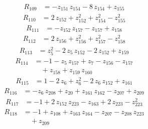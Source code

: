 \begin{equation*}\begin{aligned}
R_{109}&=-z_{151}\,z_{154} -8\,z_{154} +z_{155}
\end{aligned}\end{equation*}
\begin{equation*}\begin{aligned}
R_{110}&=2\,z_{152} +z_{152}^{2} +z_{154}^{2} -z_{155}^{2}
\end{aligned}\end{equation*}
\begin{equation*}\begin{aligned}
R_{111}&=-z_{152}\,z_{157} -z_{157} +z_{158}
\end{aligned}\end{equation*}
\begin{equation*}\begin{aligned}
R_{112}&=2\,z_{156} +z_{156}^{2} +z_{157}^{2} -z_{158}^{2}
\end{aligned}\end{equation*}
\begin{equation*}\begin{aligned}
R_{113}&=z_{5}^{2} -2\,z_{5}\,z_{152} -2\,z_{152} +z_{159}
\end{aligned}\end{equation*}
\begin{equation*}\begin{aligned}
R_{114}&=-1 -z_{5}\,z_{157} +z_{7} -z_{156} -z_{157} \\
&\quad +z_{158} +z_{159}\,z_{160}
\end{aligned}\end{equation*}
\begin{equation*}\begin{aligned}
R_{115}&=1 -2\,z_{6} +z_{6}^{2} -2\,z_{6}\,z_{152} +z_{161}
\end{aligned}\end{equation*}
\begin{equation*}\begin{aligned}
R_{116}&=-z_{6}\,z_{208} +z_{20} +z_{161}\,z_{162} -z_{207} +z_{209}
\end{aligned}\end{equation*}
\begin{equation*}\begin{aligned}
R_{117}&=-1 +2\,z_{152}\,z_{223} -z_{163} +2\,z_{223} -z_{223}^{2}
\end{aligned}\end{equation*}
\begin{equation*}\begin{aligned}
R_{118}&=-1 +z_{108} +z_{163}\,z_{164} -z_{207} -z_{208}\,z_{223} \\
&\quad +z_{209}
\end{aligned}\end{equation*}
